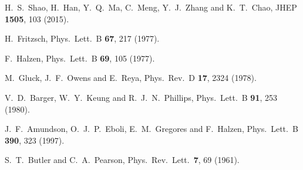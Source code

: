 \documentclass[twocolumn,aps,superscriptaddress,showpacs,nofootinbib,floatfix]{revtex4}
\begin{document}
\begin{thebibliography}{99}
  H.~S.~Shao, H.~Han, Y.~Q.~Ma, C.~Meng, Y.~J.~Zhang and K.~T.~Chao,
  JHEP {\bf 1505}, 103 (2015).

  H.~Fritzsch,
  Phys.\ Lett.\ B {\bf 67}, 217 (1977).

  F.~Halzen,
  Phys.\ Lett.\ B {\bf 69}, 105 (1977).

  M.~Gluck, J.~F.~Owens and E.~Reya,
  Phys.\ Rev.\ D {\bf 17}, 2324 (1978).

  V.~D.~Barger, W.~Y.~Keung and R.~J.~N.~Phillips,
  Phys.\ Lett.\ B {\bf 91}, 253 (1980).

  J.~F.~Amundson, O.~J.~P.~Eboli, E.~M.~Gregores and F.~Halzen,
  Phys.\ Lett.\ B {\bf 390}, 323 (1997).



  S.~T.~Butler and C.~A.~Pearson,
  Phys.\ Rev.\ Lett.\  {\bf 7}, 69 (1961).


\end{thebibliography}
\end{document}
